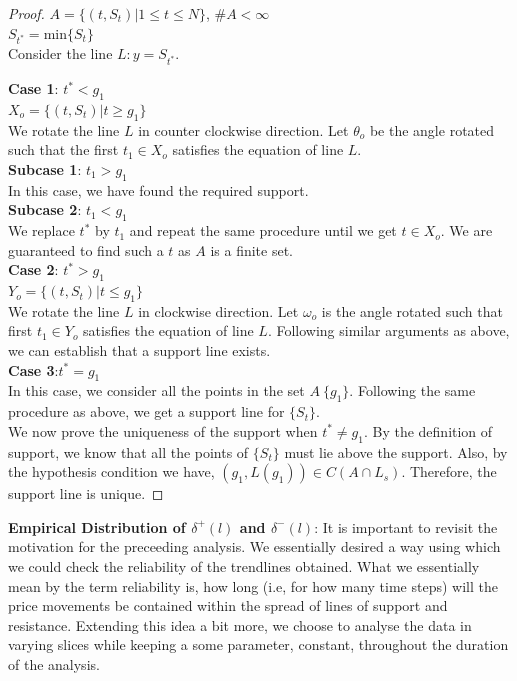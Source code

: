 \documentclass[letterpaper, 12pt] {article}
\begin{document}
	\begin{proof}
		$A=\{(t,S_t)|1\leq t\leq N\}$, $\# A<\infty$ \\
		$S_{t^*}=$min$\{ S_t\}$\\
		Consider the line $L:y=S_{t^*}$.

		\textbf{Case 1}: $t^*<g_1$\\
		$X_o=\{(t,S_t)|t\geq g_1\}$\\
		We rotate the line $L$ in counter clockwise direction.
		Let $\theta_o$ be the angle rotated such that the first $t_1\in X_o$ satisfies the equation of line $L$.\\
		\textbf{Subcase 1}: $t_1>g_1$\\
		In this case, we have found the required support.\\
		\textbf{Subcase 2}: $t_1<g_1$\\
		We replace $t^*$ by $t_1$ and repeat the same procedure until we get $t\in X_o$. We are guaranteed to find such a $t$ as $A$ is a finite set.\\
		
		\textbf{Case 2}: $t^*>g_1$\\
		$Y_o=\{(t,S_t)|t\leq g_1\}$\\
		We rotate the line $L$ in clockwise direction. Let $\omega_o$ is the angle rotated such that first $t_1\in Y_o$ satisfies the equation of line $L$. Following similar arguments as above, we can establish that a support line exists.\\
		
		\textbf{Case 3}:$t^*=g_1$\\
		In this case, we consider all the points in the set $A\ \{g_1\}$. Following the same procedure as above, we get a support line for $\{S_t\}$.\\
		
		\noindent
		We now prove the uniqueness of the support when $t^*\ne g_1$.
		By the definition of support, we know that all the points of $\{S_t\}$ must lie above the support. Also, by the hypothesis condition we have, $(g_1,L(g_1))\in C(A \cap L_s)$. Therefore, the support line is unique.
	\end{proof}
	
	\textbf{Empirical Distribution of $\delta^+(l)$ and $\delta^-(l)$}: It is important to revisit the motivation for the preceeding analysis. We essentially desired a way using which we could check the reliability of the trendlines obtained. What we essentially mean by the term reliability is, how long (i.e, for how many time steps) will the price movements be contained within the spread of lines of support and resistance. Extending this idea a bit more, we choose to analyse the data in varying slices while keeping a some parameter, constant, throughout the duration of the analysis. 
\end{document}
